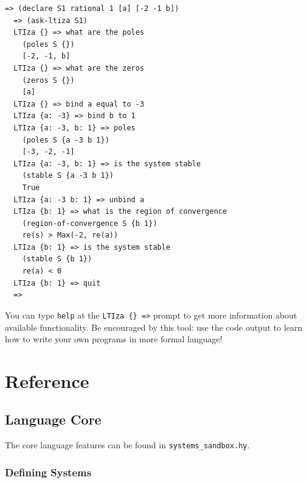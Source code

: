 \documentclass[11pt,letter]{article}
\begin{document}
\begin{lstlisting}[gobble=2]
  => (declare S1 rational 1 [a] [-2 -1 b])
  => (ask-ltiza S1)
  LTIza {} => what are the poles
    (poles S {})
    [-2, -1, b]
  LTIza {} => what are the zeros
    (zeros S {})
    [a]
  LTIza {} => bind a equal to -3
  LTIza {a: -3} => bind b to 1
  LTIza {a: -3, b: 1} => poles
    (poles S {a -3 b 1})
    [-3, -2, -1]
  LTIza {a: -3, b: 1} => is the system stable
    (stable S {a -3 b 1})
    True
  LTIza {a: -3 b: 1} => unbind a
  LTIza {b: 1} => what is the region of convergence
    (region-of-convergence S {b 1})
    re(s) > Max(-2, re(a))
  LTIza {b: 1} => is the system stable
    (stable S {b 1})
    re(a) < 0
  LTIza {b: 1} => quit
  =>
\end{lstlisting}

You can type \lstinline!help! at the \lstinline!LTIza {} =>! prompt to get more information about available functionality.
Be encouraged by this tool: use the code output to learn how to write your own programs in more formal language!

\section{Reference}

\subsection{Language Core}

The core language features can be found in \lstinline!systems_sandbox.hy!.

\subsubsection{Defining Systems}
\end{document}
